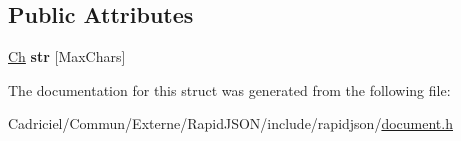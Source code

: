 \subsection*{Public Attributes}
\begin{DoxyCompactItemize}
\item 
\hyperlink{class_generic_value_ade0e0ce64ccd5d852da57a35e720bafb}{Ch} {\bfseries str} \mbox{[}Max\+Chars\mbox{]}\hypertarget{struct_generic_value_1_1_short_string_a444e24523d4cc33830d18a2cfcfd333b}{}\label{struct_generic_value_1_1_short_string_a444e24523d4cc33830d18a2cfcfd333b}

\end{DoxyCompactItemize}


The documentation for this struct was generated from the following file\+:\begin{DoxyCompactItemize}
\item 
Cadriciel/\+Commun/\+Externe/\+Rapid\+J\+S\+O\+N/include/rapidjson/\hyperlink{document_8h}{document.\+h}\end{DoxyCompactItemize}

